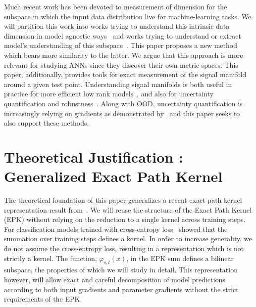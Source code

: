 Much recent work has been devoted to measurement of dimension for the subspace in which the input data distribution live for machine-learning tasks. We will partition this work into works trying to understand this intrinsic data dimension in model agnostic ways~\citep{gillette2022data, yousefzadeh2021deep, kaufman_data_2023, gilmer2018, gong2019, glielmo2022, facco2018, Levina_Bickel_2004} and works trying to understand or extract model's understanding of this subspace~\citep{dominguez-olmedo_data_2023, Ansuini_Laio_Macke_Zoccolan_2019, talwalker2008, Costa_Hero_2004b, giryes2014, Zheng_He_Qiu_Wipf_2022}. This paper proposes a new method which bears more similarity to the latter. We argue that this approach is more relevant for studying ANNs since they discover their own metric spaces. This paper, additionally, provides tools for exact measurement of the signal manifold around a given test point. Understanding signal manifolds is both useful in practice for more efficient low rank models~\citep{yang2020, swaminathan2020}, and also for uncertainty quantification and robustness~\citep{Costa_Hero_2004a, wang2021, khoury2018, srinivas2023, song2018pixeldefend, snoek2019}. Along with OOD, uncertainty quantification is increasingly relying on gradients as demonstrated by~\citet{lee2020} and this paper seeks to also support these methods. 

\section{Theoretical Justification : Generalized Exact Path Kernel}
\label{sec:gepk}
The theoretical foundation of this paper generalizes a recent exact path kernel representation result from~\citet{bell2023}. 
We will reuse the structure of the Exact Path Kernel (EPK) without relying on the reduction to a single kernel across training steps. For classification models trained with cross-entropy loss~\citet{bell2023} showed that the summation over training steps defines a kernel.
In order to increase generality, we do not assume the cross-entropy loss, resulting in a representation which is not strictly a kernel.
The function, $\varphi_{s,t}(x)$, in the EPK sum defines a bilinear subspace, the properties of which we will study in detail.
This representation however, will allow exact and careful decomposition of model predictions according to both input gradients and parameter gradients without the strict requirements of the EPK.

